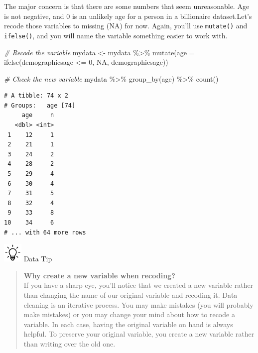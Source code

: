 \documentclass[
]{book}
\newenvironment{Shaded}{\begin{snugshade}}{\end{snugshade}}
\newcommand{\AttributeTok}[1]{\textcolor[rgb]{0.77,0.63,0.00}{#1}}
\newcommand{\CommentTok}[1]{\textcolor[rgb]{0.56,0.35,0.01}{\textit{#1}}}
\newcommand{\ConstantTok}[1]{\textcolor[rgb]{0.00,0.00,0.00}{#1}}
\newcommand{\DecValTok}[1]{\textcolor[rgb]{0.00,0.00,0.81}{#1}}
\newcommand{\FunctionTok}[1]{\textcolor[rgb]{0.00,0.00,0.00}{#1}}
\newcommand{\NormalTok}[1]{#1}
\newcommand{\OtherTok}[1]{\textcolor[rgb]{0.56,0.35,0.01}{#1}}
\newcommand{\SpecialCharTok}[1]{\textcolor[rgb]{0.00,0.00,0.00}{#1}}
\begin{document}
The major concern is that there are some numbers that seem unreasonable. Age is not negative, and 0 is an unlikely age for a person in a billionaire dataset.Let's recode those variables to missing (NA) for now. Again, you'll use \texttt{mutate()} and \texttt{ifelse()}, and you will name the variable something easier to work with.

\begin{Shaded}
\begin{Highlighting}[]
\CommentTok{\# Recode the variable}
\NormalTok{mydata }\OtherTok{\textless{}{-}}\NormalTok{ mydata }\SpecialCharTok{\%\textgreater{}\%}
  \FunctionTok{mutate}\NormalTok{(}\AttributeTok{age =} \FunctionTok{ifelse}\NormalTok{(demographicsage }\SpecialCharTok{\textless{}=} \DecValTok{0}\NormalTok{, }\ConstantTok{NA}\NormalTok{, demographicsage))}

\CommentTok{\# Check the new variable}
\NormalTok{mydata }\SpecialCharTok{\%\textgreater{}\%}
  \FunctionTok{group\_by}\NormalTok{(age) }\SpecialCharTok{\%\textgreater{}\%}
  \FunctionTok{count}\NormalTok{()}
\end{Highlighting}
\end{Shaded}

\begin{verbatim}
# A tibble: 74 x 2
# Groups:   age [74]
     age     n
   <dbl> <int>
 1    12     1
 2    21     1
 3    24     2
 4    28     2
 5    29     4
 6    30     4
 7    31     5
 8    32     4
 9    33     8
10    34     6
# ... with 64 more rows
\end{verbatim}

\includegraphics[width=0.36458in,height=\textheight]{images/bulb.png} Data Tip

\begin{quote}
\textbf{Why create a new variable when recoding?}\\
If you have a sharp eye, you'll notice that we created a new variable rather than changing the name of our original variable and recoding it. Data cleaning is an iterative process. You may make mistakes (you will probably make mistakes) or you may change your mind about how to recode a variable. In each case, having the original variable on hand is always helpful. To preserve your original variable, you create a new variable rather than writing over the old one.
\end{quote}
\end{document}
